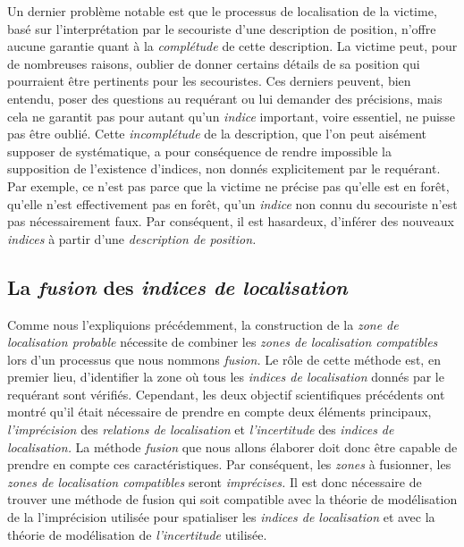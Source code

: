 Un dernier problème notable est que le processus de localisation de la
victime, basé sur l'interprétation par le secouriste d'une description
de position, n'offre aucune garantie quant à la \emph{complétude} de
cette description. La victime peut, pour de nombreuses raisons,
oublier de donner certains détails de sa position qui pourraient être
pertinents pour les secouristes. Ces derniers peuvent, bien entendu,
poser des questions au requérant ou lui demander des précisions, mais
cela ne garantit pas pour autant qu'un \emph{indice} important, voire
essentiel, ne puisse pas être oublié. Cette \emph{incomplétude} de la
description, que l'on peut aisément supposer de systématique, a pour
conséquence de rendre impossible la supposition de l’existence
d'indices, non donnés explicitement par le requérant. Par exemple, ce
n'est pas parce que la victime ne précise pas qu'elle est en forêt,
qu'elle n'est effectivement pas en forêt, \ie qu'un \emph{indice} non
connu du secouriste n'est pas nécessairement faux. Par conséquent, il
est hasardeux, d'inférer des nouveaux \emph{indices} à partir d'une
\emph{description de position.}

\subsection{La \emph{fusion} des \emph{indices de localisation}}
\label{subsec:2-1-4}

Comme nous l'expliquions précédemment, la construction de la
\emph{zone de localisation probable} nécessite de combiner les
\emph{zones de localisation compatibles} lors d'un processus que nous
nommons \emph{fusion.} Le rôle de cette méthode est, en premier lieu,
d'identifier la zone où tous les \emph{indices de localisation} donnés
par le requérant sont vérifiés. Cependant, les deux objectif
scientifiques précédents ont montré qu'il était nécessaire de prendre
en compte deux éléments principaux, \emph{l'imprécision} des
\emph{relations de localisation} et \emph{l'incertitude} des
\emph{indices de localisation.} La méthode \emph{fusion} que nous
allons élaborer doit donc être capable de prendre en compte ces
caractéristiques. Par conséquent, les \emph{zones} à fusionner, \ie
les \emph{zones de localisation compatibles} seront \emph{imprécises.}
Il est donc nécessaire de trouver une méthode de fusion qui soit
compatible avec la théorie de modélisation de la l'imprécision
utilisée pour spatialiser les \emph{indices de localisation} et avec
la théorie de modélisation de \emph{l'incertitude} utilisée.

